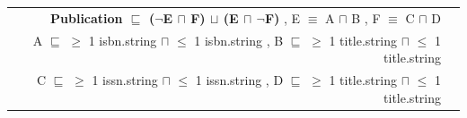 \documentclass[a4paper,fontsize=11pt]{scrartcl}
\newenvironment{DL}{
  \vspace{0cm}
	\begin{center}
  \begin{tabular}{r l}

}{
  \end{tabular}
	\end{center}
}
\begin{document}


\begin{DL}
\textbf{Publication $\sqsubseteq$ ($\neg$E $\sqcap$ F) $\sqcup$ (E $\sqcap$ $\neg$F)} , E $\equiv$ A $\sqcap$ B , F $\equiv$ C $\sqcap$ D \\
A $\sqsubseteq$ $\geq$ 1 isbn.string $\sqcap$ $\leq$ 1 isbn.string , B $\sqsubseteq$ $\geq$ 1 title.string $\sqcap$ $\leq$ 1 title.string \\
C $\sqsubseteq$ $\geq$ 1 issn.string $\sqcap$ $\leq$ 1 issn.string , D $\sqsubseteq$ $\geq$ 1 title.string $\sqcap$ $\leq$ 1 title.string \\
\end{DL}
\end{document}
